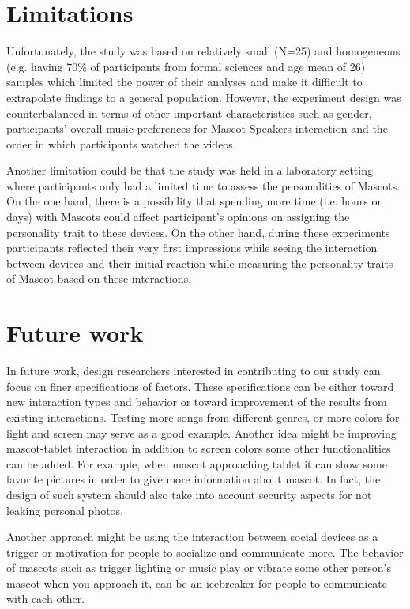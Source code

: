 \section{Limitations}
Unfortunately, the study was based on relatively small (N=25) and homogeneous (e.g. having 70\% of participants from formal sciences and age mean of 26) samples which limited the power of their analyses and make it difficult to extrapolate findings to a general population. However, the experiment design was counterbalanced in terms of other important characteristics such as gender, participants’ overall music preferences for Mascot-Speakers interaction and the order in which participants watched the videos.
\par Another limitation could be that the study was held in a laboratory setting where participants only had a limited time to assess the personalities of Mascots. On the one hand, there is a possibility that spending more time (i.e. hours or days) with Mascots could affect participant’s opinions on assigning the personality trait to these devices. On the other hand, during these experiments participants reflected their very first impressions while seeing the interaction between devices and their initial reaction while measuring the personality traits of Mascot based on these interactions.  

\section{Future work}
\par In future work, design researchers interested in contributing to our study can focus on finer specifications of factors. These specifications can be either toward new interaction types and behavior or toward improvement of the results from existing interactions. Testing more songs from different genres, or more colors for light and screen may serve as a good example. Another idea might be improving mascot-tablet interaction in addition to screen colors some other functionalities can be added. For example, when mascot approaching tablet it can show some favorite pictures in order to give more information about mascot. In fact, the design of such system should also take into account security aspects for not leaking personal photos.
\par Another approach might be using the interaction between social devices as a trigger or motivation for people to socialize and communicate more. The behavior of mascots such as trigger lighting or music play or vibrate some other person’s mascot when you approach it, can be an icebreaker for people to communicate with each other.